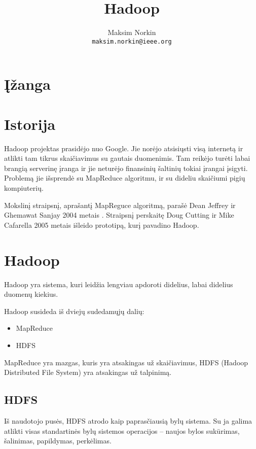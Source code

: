 \documentclass[10pt]{IEEEtran}
\author{Maksim Norkin\\ \texttt{maksim.norkin@ieee.org}}
\title{Hadoop}
\begin{document}
	\maketitle

	\section{Įžanga}

	\section{Istorija}

		Hadoop projektas prasidėjo nuo Google. Jie norėjo atsisiųsti visą internetą ir atlikti tam tikrus skaičiavimus su gautais duomenimis. Tam reikėjo turėti labai brangią serverinę įranga ir jie neturėjo finansinių šaltinių tokiai įrangai įsigyti. Problemą jie išsprendė su MapReduce algoritmu, ir su dideliu skaičiumi pigių kompiuterių.

		Mokslinį straipsnį, aprašantį MapReguce algoritmą, parašė Dean Jeffrey ir Ghemawat Sanjay 2004 metais \cite{Dean:2008:MSD:1327452.1327492}. Straipsnį perskaitę Doug Cutting ir Mike Cafarella 2005 metais išleido prototipą, kurį pavadino Hadoop.

	\section{Hadoop}

		Hadoop yra sistema, kuri leidžia lengviau apdoroti didelius, labai didelius duomenų kiekius.

		Hadoop susideda iš dviejų sudedamųjų dalių:

		\begin{itemize}
			\item MapReduce
			\item HDFS
		\end{itemize}

		MapReduce yra mazgas, kuris yra atsakingas už skaičiavimus, HDFS (Hadoop Distributed File System) yra atsakingas už talpinimą.

	\subsection{HDFS}

		Iš naudotojo pusės, HDFS atrodo kaip paprasčiausią bylų sistema. Su ja galima atlikti visas standartinės bylų sistemos operacijos -- naujos bylos sukūrimas, šalinimas, papildymas, perkėlimas.
\end{document}
